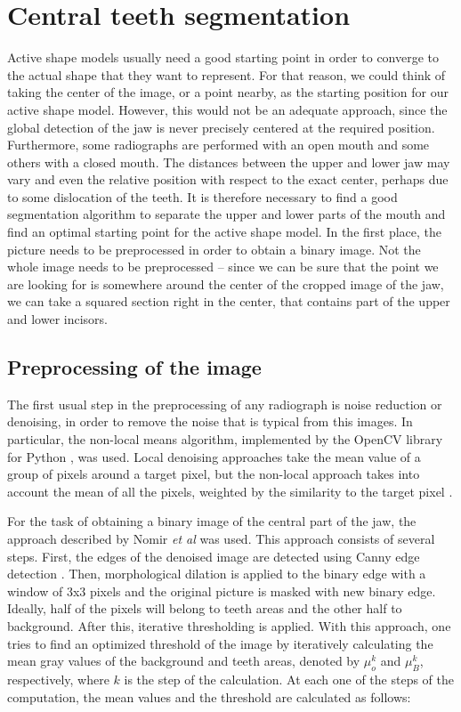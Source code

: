\documentclass[a4paper,11pt,twoside]{article}
\begin{document}
\section{Central teeth segmentation}\label{centralTeeth}

Active shape models usually need a good starting point in order to converge to the actual shape that they want to represent. For that reason, we could think of taking the center of the image, or a point nearby, as the starting position for our active shape model. However, this would not be an adequate approach, since the global detection of the jaw is never precisely centered at the required position. Furthermore, some radiographs are performed with an open mouth and some others with a closed mouth. The distances between the upper and lower jaw may vary and even the relative position with respect to the exact center, perhaps due to some dislocation of the teeth. It is therefore necessary to find a good segmentation algorithm to separate the upper and lower parts of the mouth and find an optimal starting point for the active shape model. In the first place, the picture needs to be preprocessed in order to obtain a binary image. Not the whole image needs to be preprocessed -- since we can be sure that the point we are looking for is somewhere around the center of the cropped image of the jaw, we can take a squared section right in the center, that contains part of the upper and lower incisors.

\subsection{Preprocessing of the image}

The first usual step in the preprocessing of any radiograph is noise reduction or denoising, in order to remove the noise that is typical from this images. In particular, the non-local means algorithm, implemented by the OpenCV library for Python \cite{openCV}, was used. Local denoising approaches take the mean value of a group of pixels around a target pixel, but the non-local approach takes into account the mean of all the pixels, weighted by the similarity to the target pixel \cite{nonLocalMeans}.

For the task of obtaining a binary image of the central part of the jaw, the approach described by Nomir \textit{et al} \cite{nomir} was used. This approach consists of several steps. First, the edges of the denoised image are detected using Canny edge detection \cite{canny}. Then, morphological dilation is applied to the binary edge with a window of 3x3 pixels and the original picture is masked with new binary edge. Ideally, half of the pixels will belong to teeth areas and the other half to background. After this, iterative thresholding is applied. With this approach, one tries to find an optimized threshold of the image by iteratively calculating the mean gray values of the background and teeth areas, denoted by $\mu_o^k$ and $\mu_B^k$, respectively, where $k$ is the step of the calculation. At each one of the steps of the computation, the mean values and the threshold are calculated as follows:
\end{document}
